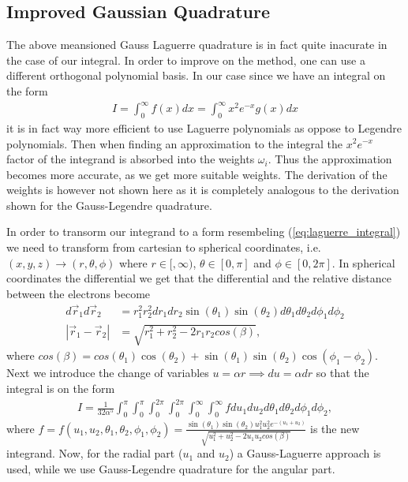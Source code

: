 \documentclass[10pt, twocolumn]{aastex62}
\begin{document}
\subsection{Improved Gaussian Quadrature}\label{subsec:improved_gauss}
The above meansioned Gauss Laguerre quadrature is in fact quite inacurate in the
case of our integral. In order to improve on the method, one can use a different
orthogonal polynomial basis. In our case since we have an integral on the form
\begin{align}
	I = \int^\infty_0 f(x)dx = \int^\infty_0x^2e^{-x}g(x) dx
	\label{eq:laguerre_integral}
\end{align}
it is in fact way more efficient to use Laguerre polynomials as oppose to
Legendre polynomials. Then when finding an approximation to the integral the
$x^2e^{-x}$ factor of the integrand is absorbed into the weights $\omega_i$.
Thus the approximation becomes more accurate, as we get more suitable weights.
The derivation of the weights is however not shown here as it is completely
analogous to the derivation shown for the Gauss-Legendre quadrature.

In order to transorm our integrand to a form resembeling
(\ref{eq:laguerre_integral}) we need to transform from cartesian to spherical
coordinates, i.e. $(x, y, z)\to(r, \theta, \phi)$ where $r\in[,\infty)$,
$\theta\in[0,\pi]$ and $\phi\in[0,2\pi]$. In spherical coordinates the
differential we get that the differential and the relative distance between the
electrons become 
\begin{align}
	d\vec{r}_1d\vec{r}_2 &= r_1^2r_2^2 dr_1dr_2\sin(\theta_1)\sin(\theta_2)d\theta_1d\theta_2d\phi_1d\phi_2\\
	|\vec{r}_1 - \vec{r}_2| &= \sqrt{r_1^2 + r_2^2 - 2r_1r_2cos(\beta)},
\end{align}
where $cos(\beta) = cos(\theta_1)\cos(\theta_2) +
\sin(\theta_1)\sin(\theta_2)\cos(\phi_1 - \phi_2)$. Next we introduce the change
of variables $u = \alpha r \implies du = \alpha dr$ so that the integral is on
the form
\begin{align}
	I = \frac{1}{32 \alpha^5} \int^\pi_0\int^{\pi}_0\int^{2\pi}_0\int^{2\pi}_0\int^\infty_0\int^\infty_0 fdu_1du_2d\theta_1d\theta_2d\phi_1d\phi_2,
	\label{eq:spherical_integral}
\end{align}
where $f = f(u_1, u_2, \theta_1, \theta_2, \phi_1, \phi_2) = \frac{\sin
	(\theta_1)\sin(\theta_2)u_1^2u_2^2e^{-(u_1+u_2)}}{\sqrt{u_1^2 + u_2^2 -
	2u_1u_2cos(\beta)}}$ is the new integrand. Now, for the radial part ($u_1$
	and $u_2$) a Gauss-Laguerre approach is used, while we use Gauss-Legendre
	quadrature for the angular part. 
\end{document}

